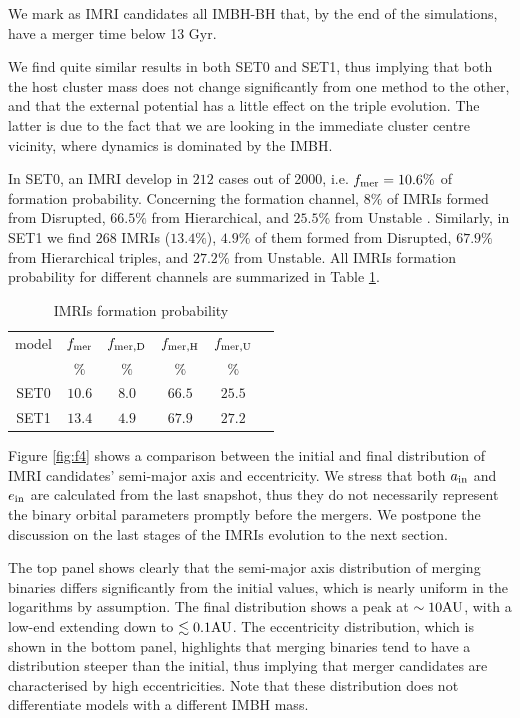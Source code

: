 \documentclass[twocolumn]{aastex62}
\newcommand{\au}{{\rm AU}}
\newcommand{\inn}{{\rm in}}
\begin{document}
We mark as IMRI candidates all IMBH-BH that, by the end of the simulations, have a merger time below 13 Gyr. 

We find quite similar results in both SET0 and SET1, thus implying that both the host cluster mass does not change significantly from one method to the other, and that the external potential has a little effect on the triple evolution. The latter is due to the fact that we are looking in the immediate cluster centre vicinity, where dynamics is dominated by the IMBH.

In SET0, an IMRI develop in $212$ cases out of 2000, i.e. $f_{\rm mer} = 10.6\%$ of formation probability. Concerning the formation channel, $8\%$ of IMRIs formed from Disrupted, $66.5\%$ from Hierarchical, and $25.5\%$ from Unstable . Similarly, in SET1 we find $268$ IMRIs ($13.4\%$), $4.9\%$ of them formed from Disrupted, $67.9\%$ from Hierarchical triples, and $27.2\%$ from Unstable. All IMRIs formation probability for different channels are summarized in Table \ref{tab:t3}.

\begin{table}
    \centering
    \caption{IMRIs formation probability}
    \begin{tabular}{cccccc}
        \hline
        \hline 
        model& $f_{\rm mer}$ & $f_{\rm mer,D}$ & $f_{\rm mer,H}$ & $f_{\rm mer,U}$\\
             & $\%$& $\%$& $\%$& $\%$\\
        \hline
        SET0 & $10.6$ & $8.0$ & $66.5$ & $25.5$ \\
        SET1 & $13.4$ & $4.9$ & $67.9$ & $27.2$ \\
        \hline
    \end{tabular}
    \label{tab:t3}
\end{table}


Figure \ref{fig:f4} shows a comparison between the initial and final distribution of IMRI candidates' semi-major axis and eccentricity. We stress that both $a_\inn$ and $e_\inn$ are calculated from the last snapshot, thus they do not necessarily represent the binary orbital parameters promptly before the mergers. We postpone the discussion on the last stages of the IMRIs evolution to the next section.

The top panel shows clearly that the semi-major axis distribution of merging binaries differs significantly from the initial values, which is nearly uniform in the logarithms by assumption. The final distribution shows a peak at $\sim 10\au$, with a low-end extending down to $\lesssim 0.1 \au$. The eccentricity distribution, which is shown in the bottom panel, highlights that merging binaries tend to have a distribution steeper than the initial, thus implying that merger candidates are characterised by high eccentricities. Note that these distribution does not differentiate models with a different IMBH mass. 
\end{document}
